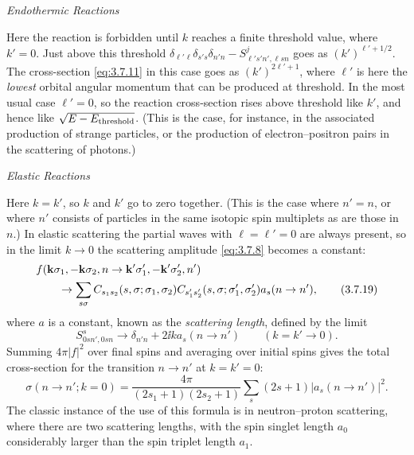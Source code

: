 \begin{center}\emph{Endothermic Reactions}\end{center}

Here the reaction is forbidden until $k$ reaches a finite threshold value,
where $k'=0$. Just above this threshold
$\delta_{\ell'\ell}\delta_{s's}\delta_{n'n}
-S^j_{\ell's'n',\ell sn}$ goes as $(k')^{\ell'+1/2}$. The cross-section
\eqref{eq:3.7.11} in this case goes as $(k')^{2\ell'+1}$, where $\ell'$ is here the
\emph{lowest} orbital angular momentum that can be produced at threshold. In
the most usual case $\ell'=0$, so the reaction cross-section rises above
threshold like $k'$, and hence like $\sqrt{E-E_{\rm threshold}}$. (This is the
case, for instance, in the associated production of strange particles, or the
production of electron--positron pairs in the scattering of photons.)

\begin{center}\emph{Elastic Reactions}\end{center}

Here $k=k'$, so $k$ and $k'$ go to zero together. (This is the case where
$n'=n$, or where $n'$ consists of particles in the same isotopic spin
multiplets as are those in $n$.) In elastic scattering the partial waves with
$\ell=\ell'=0$ are always present, so in the limit $k\to0$ the scattering
amplitude \eqref{eq:3.7.8} becomes a constant:
\begin{align}
  &f(\mathbf k\sigma_1,-\mathbf k\sigma_2,n
       \to\mathbf k'\sigma'_1,-\mathbf k'\sigma'_2,n') \notag\\
  &\qquad\to\sum_{s\sigma}
    C_{s_1s_2}(s,\sigma;\sigma_1,\sigma_2)
    C_{s'_1s'_2}(s,\sigma;\sigma'_1,\sigma'_2)a_s(n\to n'),
  \tag{3.7.19}\label{eq:3.7.19}
\end{align}
where $a$ is a constant, known as the \emph{scattering length}, defined by the
limit
\begin{equation}
  S^s_{0sn',0sn}\longrightarrow\delta_{n'n}+2\ii ka_s(n\to n')
  \qquad(k=k'\to0).
  \tag{3.7.20}\label{eq:3.7.20}
\end{equation}
Summing $4\pi|f|^2$ over final spins and averaging over initial spins gives the
total cross-section for the transition $n\to n'$ at $k=k'=0$:
\begin{equation}
  \sigma(n\to n';k=0)
  =\frac{4\pi}{(2s_1+1)(2s_2+1)}
    \sum_s(2s+1)|a_s(n\to n')|^2.
  \tag{3.7.21}\label{eq:3.7.21}
\end{equation}
The classic instance of the use of this formula is in neutron--proton
scattering, where there are two scattering lengths, with the spin singlet
length $a_0$ considerably larger than the spin triplet length $a_1$.

